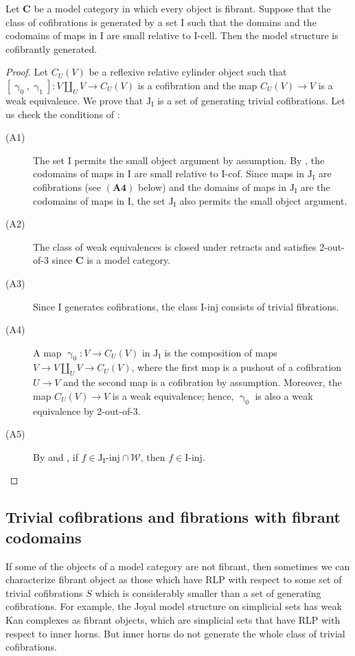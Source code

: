\documentclass{tac}
\theoremstyle{definition}
\newcommand{\we}{\mathcal{W}}
\newcommand{\cat}[1]{\mathbf{#1}}
\newcommand{\C}{\cat{C}}
\newcommand{\I}{\mathrm{I}}
\newcommand{\J}{\mathrm{J}}
\newcommand{\class}[2]{#1\text{-}\mathrm{#2}}
\newcommand{\Iinj}[1][\I]{\class{#1}{inj}}
\newcommand{\Icell}[1][\I]{\class{#1}{cell}}
\newcommand{\Icof}[1][\I]{\class{#1}{cof}}
\newcommand{\Jinj}[1][]{\Iinj[\J#1]}
\newcommand{\cyli}{\upgamma}
\begin{document}
\begin{prop}
Let $\C$ be a model category in which every object is fibrant.
Suppose that the class of cofibrations is generated by a set $\I$ such that
the domains and the codomains of maps in $\I$ are small relative to $\Icell$.
Then the model structure is cofibrantly generated.
\end{prop}
\begin{proof}
Let $C_U(V)$ be a reflexive relative cylinder object such that $[\cyli_0,\cyli_1] : V \amalg_U V \to C_U(V)$ is a cofibration and the map $C_U(V) \to V$ is a weak equivalence.
We prove that $\J_\I$ is a set of generating trivial cofibrations.
Let us check the conditions of :
\begin{description}
\item[(A1)] The set $\I$ permits the small object argument by assumption.
By \cite[Proposition~2.1.16]{hovey}, the codomains of maps in $\I$ are small relative to $\Icof$.
Since maps in $\J_\I$ are cofibrations (see $\mathbf{(A4)}$ below) and the domains of maps in $\J_\I$ are the codomains of maps in $\I$,
the set $\J_\I$ also permits the small object argument.
\item[(A2)] The class of weak equivalences is closed under retracts and satisfies 2-out-of-3 since $\C$ is a model category.
\item[(A3)] Since $\I$ generates cofibrations, the class $\Iinj$ consists of trivial fibrations.
\item[(A4)] A map $\cyli_0 : V \to C_U(V)$ in $\J_\I$ is the composition of maps $V \to V \amalg_U V \to C_U(V)$,
where the first map is a pushout of a cofibration $U \to V$ and the second map is a cofibration by assumption.
Moreover, the map $C_U(V) \to V$ is a weak equivalence; hence, $\cyli_0$ is also a weak equivalence by 2-out-of-3.
\item[(A5)] By  and , if $f \in \Jinj[_\I] \cap \we$, then $f \in \Iinj$.
\end{description}
\end{proof}

\subsection{Trivial cofibrations and fibrations with fibrant codomains}

If some of the objects of a model category are not fibrant, then sometimes we can characterize fibrant object as those which have
RLP with respect to some set of trivial cofibrations $S$ which is considerably smaller than a set of generating cofibrations.
For example, the Joyal model structure on simplicial sets has weak Kan complexes as fibrant objects,
which are simplicial sets that have RLP with respect to inner horns.
But inner horns do not generate the whole class of trivial cofibrations.
\end{document}
